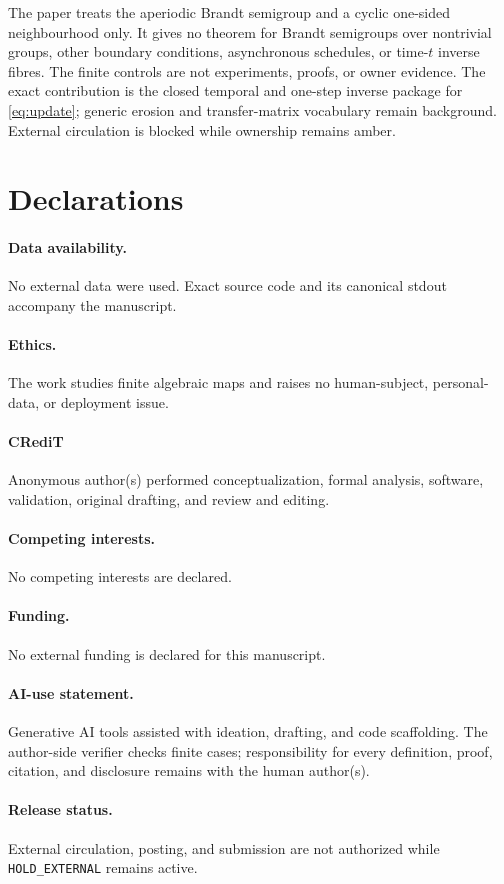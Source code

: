 \documentclass[a4paper,10pt]{amsart}
\theoremstyle{remark}
\begin{document}
The paper treats the aperiodic Brandt semigroup and a cyclic one-sided
neighbourhood only.  It gives no theorem for Brandt semigroups over nontrivial
groups, other boundary conditions, asynchronous schedules, or time-$t$
inverse fibres.  The finite controls are not experiments, proofs, or owner
evidence.  The exact contribution is the closed temporal and one-step inverse
package for \eqref{eq:update}; generic erosion and transfer-matrix vocabulary
remain background.  External circulation is blocked while ownership remains
amber.

\section*{Declarations}

\paragraph{Data availability.} No external data were used.  Exact source code
and its canonical stdout accompany the manuscript.
\paragraph{Ethics.} The work studies finite algebraic maps and raises no
human-subject, personal-data, or deployment issue.
\paragraph{CRediT} Anonymous author(s) performed conceptualization, formal
analysis, software, validation, original drafting, and review and editing.
\paragraph{Competing interests.} No competing interests are declared.
\paragraph{Funding.} No external funding is declared for this manuscript.
\paragraph{AI-use statement.} Generative AI tools assisted with ideation,
drafting, and code scaffolding.  The author-side verifier checks finite cases;
responsibility for every definition, proof, citation, and disclosure remains
with the human author(s).
\paragraph{Release status.} External circulation, posting, and submission are
not authorized while \texttt{HOLD\_EXTERNAL} remains active.



\end{document}
